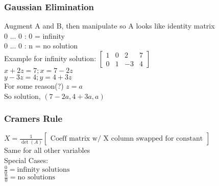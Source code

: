 \documentclass{article}
\begin{document}
	\subsubsection*{Gaussian Elimination}
	Augment A and B, then manipulate so A looks like identity matrix \\
	 0 ... 0 :  0 = infinity \\
	 0 ... 0 : n = no solution \\
	Example for infinity solution: $\begin{bmatrix}
		1 & 0 & 2 & 7 \\
		0 & 1 & -3 & 4
	\end{bmatrix}$ \\
	\indent $x + 2z = 7; x = 7 - 2z$ \\
	\indent $y - 3z = 4; y = 4 + 3z$ \\
	\indent For some reason(?) $z = a$ \\
	\indent So solution, $(7 - 2a, 4+3a, a)$
	
	\subsubsection*{Cramers Rule}
	$X = \frac{1}{\det(A)}\begin{bmatrix}
		\text{Coeff matrix w/ X column swapped for constant}
	\end{bmatrix}$ \\
	Same for all other variables \\
	Special Cases: \\
	\indent $\frac{0}{0} = \text{infinity solutions}$ \\
	\indent $\frac{n}{0} = \text{no solutions}$
\end{document}
